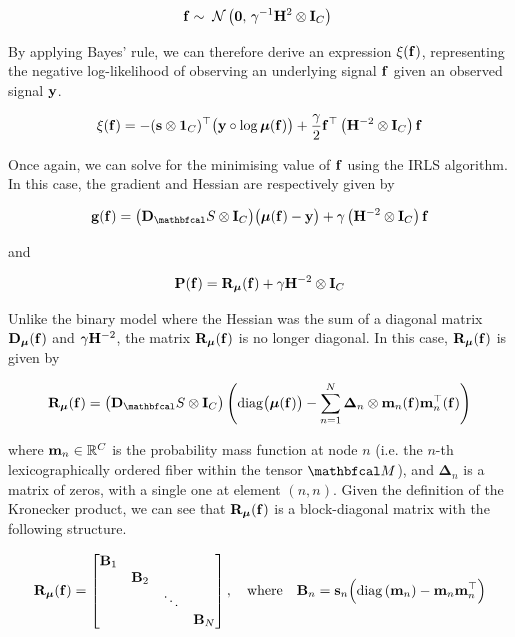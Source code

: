 \begin{equation}
    \label{eq:f_prior_mc_lgsr}
    \mathbf{f} \sim \; \mathcal{N}\left(\mathbf{0}, \, \gamma^{-1} \mathbf{H}^2 \otimes \mathbf{I}_C\right) \;
\end{equation}

By applying Bayes' rule, we can therefore derive an expression $\xi(\mathbf{f})$, representing the negative log-likelihood of observing an underlying signal $\mathbf{f}$ given an observed signal $\mathbf{y}$. 

\begin{equation}
    \xi(\mathbf{f}) = - (\mathbf{s} \otimes \mathbf{1}_C)^\top \big(\mathbf{y} \circ \log \boldsymbol{\mu}(\mathbf{f}) \big) + \frac{\gamma}{2} \mathbf{f}^\top \left(\mathbf{H}^{-2} \otimes \mathbf{I}_C\right) \mathbf{f}
\end{equation}

Once again, we can solve for the minimising value of $\mathbf{f}$ using the IRLS algorithm. In this case, the gradient and Hessian are respectively given by 

\begin{equation}
    \g(\f) = \big(\D_\St \otimes \I_C\big) \big(\muu(\f) - \y\big) + \gamma \left(\HH^{-2} \otimes \I_C\right) \f
\end{equation}

and

\begin{equation}
    \mathbf{P}(\mathbf{f}) = \mathbf{R}_{\boldsymbol{\mu}}(\mathbf{f}) + \gamma \mathbf{H}^{-2} \otimes \mathbf{I}_C
\end{equation}

Unlike the binary model where the Hessian was the sum of a diagonal matrix $\mathbf{D}_{\boldsymbol{\mu}}(\mathbf{f})$ and $\gamma \mathbf{H}^{-2}$, the matrix $\mathbf{R}_{\boldsymbol{\mu}}(\mathbf{f})$ is no longer diagonal. In this case, $\mathbf{R}_{\boldsymbol{\mu}}(\mathbf{f})$ is given by 

\begin{equation}
    \RR_{\muu}(\f) =  \big(\D_\St \otimes \I_C\big) \left(\Diag{\muu(\f)} - \sum_{n=1}^N \mathbf{\Delta}_{n} \otimes \m_n (\f) \m_n^\top(\f) \right)
\end{equation}

where $\mathbf{m}_n \in \mathbb{R}^C$ is the probability mass function at node $n$ (i.e. the $n$-th lexicographically ordered fiber within the tensor $\Mt$), and $\mathbf{\Delta}_{n}$ is a matrix of zeros, with a single one at element $(n, n)$. Given the definition of the Kronecker product, we can see that $\mathbf{R}_{\boldsymbol{\mu}}(\mathbf{f})$ is a block-diagonal matrix with the following structure. 

\begin{equation*}
    \mathbf{R}_{\boldsymbol{\mu}}(\mathbf{f}) = \begin{bmatrix}
        \mathbf{B}_1 & & & \\
        & \mathbf{B}_2 & & \\
        & & \ddots & \\
        & & & \mathbf{B}_N
    \end{bmatrix}, \quad \text{where} \quad \mathbf{B}_n = \mathbf{s}_n \Big(\text{\textup{diag}}\left(\mathbf{m}_n\right) - \mathbf{m}_n \mathbf{m}_n^\top\Big)
\end{equation*}

